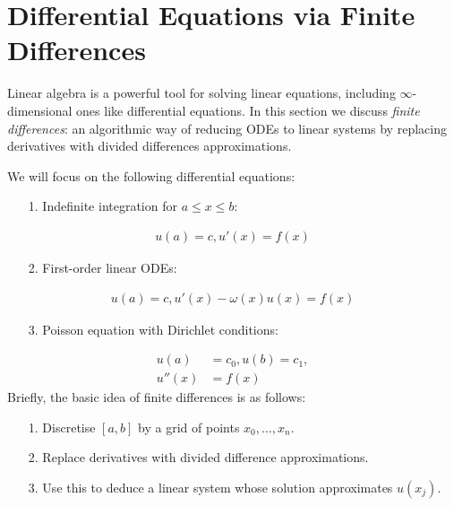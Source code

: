 
\section{Differential Equations via Finite Differences}
Linear algebra is a powerful tool for solving linear equations, including \ensuremath{\infty}-dimensional ones like differential equations. In this section we discuss \emph{finite differences}: an algorithmic way of reducing ODEs to linear systems by replacing derivatives with divided differences approximations. 

We will focus on the following differential equations:

\begin{itemize}
\item[1. ] Indefinite integration for $a \ensuremath{\leq} x \ensuremath{\leq} b$:

\end{itemize}

\begin{align*}
u(a) = c, u'(x) = f(x)
\end{align*}
\begin{itemize}
\item[2. ] First-order linear ODEs:
\end{itemize}

\begin{align*}
u(a) = c, u'(x) - \ensuremath{\omega}(x) u(x) = f(x)
\end{align*}
\begin{itemize}
\item[3. ] Poisson equation with Dirichlet conditions:

\end{itemize}

\begin{align*}
u(a) &= c_0, u(b) = c_1, \\
u''(x) &= f(x)
\end{align*}
Briefly, the basic idea of finite differences is as follows:

\begin{itemize}
\item[1. ] Discretise $[a,b]$ by a grid of points $x_0,\ensuremath{\ldots},x_n$.


\item[2. ] Replace derivatives with divided difference approximations.


\item[3. ] Use this to deduce a linear system whose solution approximates $u(x_j)$. 

\end{itemize}
